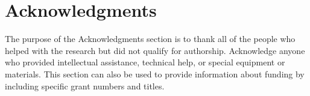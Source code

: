 \documentclass[final,11pt,3p]{elsarticle}
\begin{document}
\section*{Acknowledgments}
The purpose of the Acknowledgments section is to thank all of the people who helped with the research but did not qualify for authorship. Acknowledge anyone who provided intellectual assistance, technical help, or special equipment or materials. This section can also be used to provide information about funding by including specific grant numbers and titles. 





% 









\end{document}
